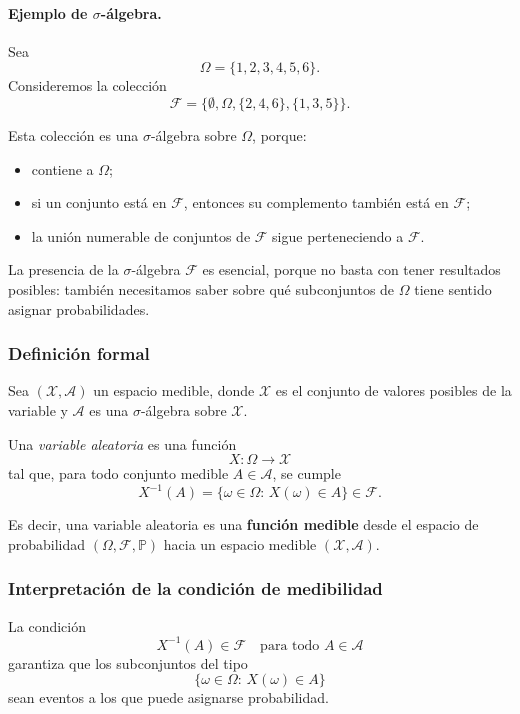 \documentclass{article}
\begin{document}
\paragraph{Ejemplo de \(\sigma\)-álgebra.}
Sea
\[
\Omega=\{1,2,3,4,5,6\}.
\]
Consideremos la colección
\[
\mathcal{F}=\{\emptyset,\Omega,\{2,4,6\},\{1,3,5\}\}.
\]

Esta colección es una \(\sigma\)-álgebra sobre \(\Omega\), porque:

\begin{itemize}
\item contiene a \(\Omega\);
\item si un conjunto está en \(\mathcal{F}\), entonces su complemento también está en \(\mathcal{F}\);
\item la unión numerable de conjuntos de \(\mathcal{F}\) sigue perteneciendo a \(\mathcal{F}\).
\end{itemize}

La presencia de la \(\sigma\)-álgebra \(\mathcal{F}\) es esencial, porque no basta con tener resultados posibles: también necesitamos saber sobre qué subconjuntos de \(\Omega\) tiene sentido asignar probabilidades.

\subsubsection*{Definición formal}

Sea \((\mathcal{X},\mathcal{A})\) un espacio medible, donde \(\mathcal{X}\) es el conjunto de valores posibles de la variable y \(\mathcal{A}\) es una \(\sigma\)-álgebra sobre \(\mathcal{X}\).

Una \textit{variable aleatoria} es una función
\[
X:\Omega \to \mathcal{X}
\]
tal que, para todo conjunto medible \(A\in\mathcal{A}\), se cumple
\[
X^{-1}(A)=\{\omega\in\Omega:\, X(\omega)\in A\}\in\mathcal{F}.
\]

Es decir, una variable aleatoria es una \textbf{función medible} desde el espacio de probabilidad \((\Omega,\mathcal{F},\mathbb{P})\) hacia un espacio medible \((\mathcal{X},\mathcal{A})\).

\subsubsection*{Interpretación de la condición de medibilidad}

La condición
\[
X^{-1}(A)\in\mathcal{F}
\quad \text{para todo } A\in\mathcal{A}
\]
garantiza que los subconjuntos del tipo
\[
\{\omega\in\Omega:\, X(\omega)\in A\}
\]
sean eventos a los que puede asignarse probabilidad.
\end{document}
